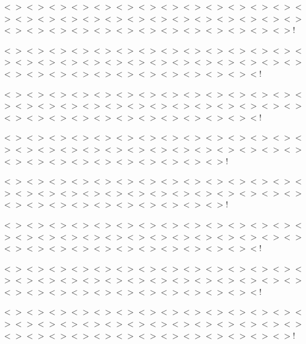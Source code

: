 $<$$>$$<$$>$$<$$>$$<$$>$$<$$>$$<$$>$$<$$>$$<$$>$$<$$>$$<$$>$$<$$>$$<$$>$$<$$>$$<$$>$$<$$>$$<$$>$$<$$>$$<$$>$$<$$>$$<$$>$$<$$>$$<$$>$$<$$>$$<$$>$$<$$>$$<$$>$$<$$>$$<$$>$$<$$>$$<$$>$$<$$>$$<$$>$$<$$>$$<$$>$$<$$>$$<$$>$$<$$>$$<$$>$$<$$>$$<$$>$!

$<$$>$$<$$>$$<$$>$$<$$>$$<$$>$$<$$>$$<$$>$$<$$>$$<$$>$$<$$>$$<$$>$$<$$>$$<$$>$$<$$>$$<$$>$$<$$>$$<$$>$$<$$>$$<$$>$$<$$>$$<$$>$$<$$>$$<$$>$$<$$>$$<$$>$$<$$>$$<$$>$$<$$>$$<$$>$$<$$>$$<$$>$$<$$>$$<$$>$$<$$>$$<$$>$$<$$>$$<$$>$$<$$>$$<$!

$<$$>$$<$$>$$<$$>$$<$$>$$<$$>$$<$$>$$<$$>$$<$$>$$<$$>$$<$$>$$<$$>$$<$$>$$<$$>$$<$$>$$<$$>$$<$$>$$<$$>$$<$$>$$<$$>$$<$$>$$<$$>$$<$$>$$<$$>$$<$$>$$<$$>$$<$$>$$<$$>$$<$$>$$<$$>$$<$$>$$<$$>$$<$$>$$<$$>$$<$$>$$<$$>$$<$$>$$<$$>$$<$$>$$<$!

$<$$>$$<$$>$$<$$>$$<$$>$$<$$>$$<$$>$$<$$>$$<$$>$$<$$>$$<$$>$$<$$>$$<$$>$$<$$>$$<$$>$$<$$>$$<$$>$$<$$>$$<$$>$$<$$>$$<$$>$$<$$>$$<$$>$$<$$>$$<$$>$$<$$>$$<$$>$$<$$>$$<$$>$$<$$>$$<$$>$$<$$>$$<$$>$$<$$>$$<$$>$$<$$>$$<$$>$$<$$>$!

$<$$>$$<$$>$$<$$>$$<$$>$$<$$>$$<$$>$$<$$>$$<$$>$$<$$>$$<$$>$$<$$>$$<$$>$$<$$>$$<$$>$$<$$>$$<$$>$$<$$>$$<$$>$$<$$>$$<$$>$$<$$>$$<$$>$$<$$>$$<$$>$$<$$>$$<$$>$$<$$>$$<$$>$$<$$>$$<$$>$$<$$>$$<$$>$$<$$>$$<$$>$$<$$>$$<$$>$$<$$>$!

$<$$>$$<$$>$$<$$>$$<$$>$$<$$>$$<$$>$$<$$>$$<$$>$$<$$>$$<$$>$$<$$>$$<$$>$$<$$>$$<$$>$$<$$>$$<$$>$$<$$>$$<$$>$$<$$>$$<$$>$$<$$>$$<$$>$$<$$>$$<$$>$$<$$>$$<$$>$$<$$>$$<$$>$$<$$>$$<$$>$$<$$>$$<$$>$$<$$>$$<$$>$$<$$>$$<$$>$$<$$>$$<$$>$$<$!

$<$$>$$<$$>$$<$$>$$<$$>$$<$$>$$<$$>$$<$$>$$<$$>$$<$$>$$<$$>$$<$$>$$<$$>$$<$$>$$<$$>$$<$$>$$<$$>$$<$$>$$<$$>$$<$$>$$<$$>$$<$$>$$<$$>$$<$$>$$<$$>$$<$$>$$<$$>$$<$$>$$<$$>$$<$$>$$<$$>$$<$$>$$<$$>$$<$$>$$<$$>$$<$$>$$<$$>$$<$$>$$<$$>$$<$!

$<$$>$$<$$>$$<$$>$$<$$>$$<$$>$$<$$>$$<$$>$$<$$>$$<$$>$$<$$>$$<$$>$$<$$>$$<$$>$$<$$>$$<$$>$$<$$>$$<$$>$$<$$>$$<$$>$$<$$>$$<$$>$$<$$>$$<$$>$$<$$>$$<$$>$$<$$>$$<$$>$$<$$>$$<$$>$$<$$>$$<$$>$$<$$>$$<$$>$$<$$>$$<$$>$$<$$>$$<$$>$$<$$>$$<$$>$$<$$>$!

